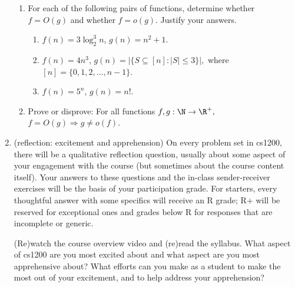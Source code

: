 \documentclass[11pt]{article}
\begin{document}
\begin{enumerate}
\begin{enumerate}
    \item For each of the following pairs of functions, determine whether $f=O(g)$ and whether $f=o(g)$.  Justify your answers.
    \begin{enumerate}
        \item $f(n) = 3\log_2^3 n$, $g(n) = n^2+1$.
        \item $f(n) = 4n^3$, $g(n)= \left| \{S \subseteq [n] : |S|\leq 3\}\right|,$ where $[n]=\{0,1,2,\ldots,n-1\}$.  
        \item $f(n) = 5^n$, $g(n)=n!$.
    \end{enumerate}

    \item Prove or disprove: For all functions $f,g : \N\rightarrow \R^+,$ $f=O(g) \Rightarrow g\neq o(f)$.
\end{enumerate}

\item (reflection: excitement and apprehension)  On every problem set in cs1200, there will be a qualitative reflection question, usually about some aspect of your engagement with the course (but sometimes about the course content itself). Your answers to these questions and the in-class sender-receiver exercises will be the basis of your participation grade.  For starters, every thoughtful answer with some specifics will receive an R grade; R+ will be reserved for exceptional ones and grades below R for responses that are incomplete or generic.

(Re)watch the course overview video and (re)read the syllabus.  What aspect of cs1200 are you most excited about and what aspect are you most apprehensive about?  What efforts can you make as a student to make the most out of your excitement, and to help address your apprehension?
\end{enumerate}
\end{document}
